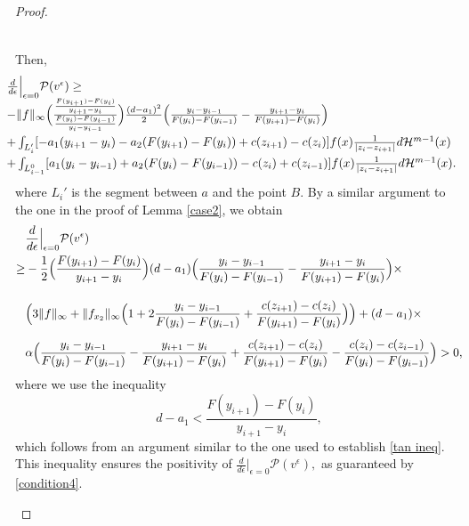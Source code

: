 \documentclass[12pt,reqno]{amsart}
\begin{document}
\begin{proof}
\begin{enumerate}
\begin{enumerate}
\[\begin{array}{ll}
   \end{array}\]

   Then, 
    \[\hspace{-0.8cm}\begin{array}{ll}
         &\frac{d}{d\epsilon}\Big|_{\epsilon=0} \mathcal P(v^\epsilon)  \ge\\
         &-\|f\|_\infty\Big(\frac{\frac{F(y_{i+1})-F(y_{i})}{y_{i+1}-y_{i}}}{\frac{F(y_i)-F(y_{i-1})}{y_i-y_{i-1}}}\Big)\frac{(d-a_1)^2}{2}\Big(\frac{y_i-y_{i-1}}{F(y_i)-F(y_{i-1})}-\frac{y_{i+1}-y_i}{F(y_{i+1})-F(y_i)}\Big)\vspace{3pt}\\
      &+\int_{L'_{i}}[-a_1(y_{i+1}-y_i)-a_2(F(y_{i+1})-F(y_i)) +c(z_{i+1})-c(z_{i}) ]f(x)\frac{1}{|z_i-z_{i+1}|}d\mathcal H^{m-1}(x) \vspace{3pt}\\
&+   \int_{L^0_{i-1}}[a_1(y_i-y_{i-1})+a_2(F(y_{i})-F(y_{i-1}))-c(z_i) + c(z_{i-1}) ]f(x)\frac{1}{|z_i-z_{i+1}|}d\mathcal H^{m-1}(x). 
\end{array}\]
   where $L_{i}'$ is the segment between $a$ and the point $B.$ By a similar argument to the one in the proof of Lemma \ref{case2}, we obtain  
\[
\begin{aligned}
&\frac{d}{d\epsilon} \Big|_{\epsilon=0} \mathcal{P}(v^\epsilon) \vspace{3pt}\\
\geq & -\frac{1}{2} \Big(\frac{F(y_{i+1}) - F(y_i)}{y_{i+1} - y_i} \Big)(d - a_1) 
\Big(\frac{y_i - y_{i-1}}{F(y_i) - F(y_{i-1})} - \frac{y_{i+1} - y_i}{F(y_{i+1}) - F(y_i)} \Big) \times \\[10pt]
& \Big( 3\|f\|_\infty + \|f_{x_2}\|_\infty \Big(1 + 2\frac{y_i - y_{i-1}}{F(y_i) - F(y_{i-1})} + \frac{c(z_{i+1}) - c(z_i)}{F(y_{i+1}) - F(y_i)} \Big) \Big)+ (d - a_1)\times \\[5pt]
&  \alpha \Big( \frac{y_i - y_{i-1}}{F(y_i) - F(y_{i-1})} - \frac{y_{i+1} - y_i}{F(y_{i+1}) - F(y_i)} 
+ \frac{c(z_{i+1}) - c(z_i)}{F(y_{i+1}) - F(y_i)} - \frac{c(z_i) - c(z_{i-1})}{F(y_i) - F(y_{i-1})} \Big) > 0,
\end{aligned}
\]
where we use the inequality  
\[
d - a_1 < \frac{F(y_{i+1}) - F(y_i)}{y_{i+1} - y_i},
\]  
which follows from an argument similar to the one used to establish \eqref{tan ineq}. This inequality ensures the positivity of $\frac{d}{d\epsilon} \Big|_{\epsilon=0} \mathcal{P}(v^\epsilon),$ as guaranteed by \ref{condition4}.
   \end{enumerate}
\end{enumerate}\end{proof}
\end{document}
